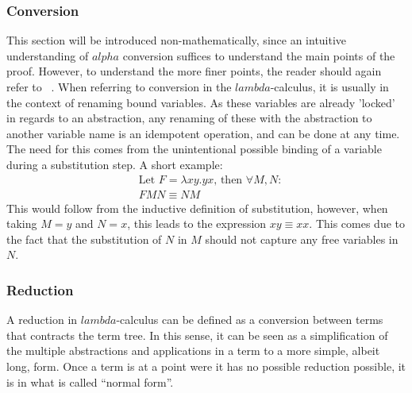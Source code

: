 \documentclass[12pt]{article}
\begin{document}
\subsubsection{Conversion}
This section will be introduced non-mathematically, since an intuitive understanding of $alpha$ conversion suffices to understand the main points of the proof. However, to understand the more finer points, the reader should again refer to ~\cite{barendregt1984lambda}.
When referring to conversion in the $lambda$-calculus, it is usually in the context of renaming bound variables. As these variables are already 'locked' in regards to an abstraction, any renaming of these with the abstraction to another variable name is an idempotent operation, and can be done at any time.
The need for this comes from the unintentional possible binding of a variable during a substitution step. A short example:
\begin{equation}
  \begin{split}
    & \text{Let } F = \lambda xy.yx \text{, then } \forall M, N: \\
    & FMN \equiv NM
  \end{split}
\end{equation}
This would follow from the inductive definition of substitution, however, when taking $M = y$ and $N = x$, this leads to the expression $xy \equiv xx$.
This comes due to the fact that the substitution of $N$ in $M$ should not capture any free variables in $N$.
\subsubsection{Reduction}
\label{reduction}
A reduction in $lambda$-calculus can be defined as a conversion between terms that contracts the term tree. In this sense, it can be seen as a simplification of the multiple abstractions and applications in a term to a more simple, albeit long, form. Once a term is at a point were it has no possible reduction possible, it is in what is called \enquote{normal form}.
\end{document}
